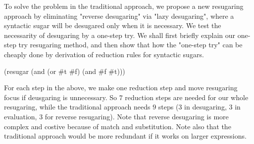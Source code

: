 To solve the problem in the traditional approach, we propose a new resugaring approach by eliminating "reverse desugaring" via "lazy desugaring", where a syntactic sugar will be desugared only when it is necessary. We test the necessarity of desugaring by a one-step try. We shall first briefly explain our one-step try resugaring method, and then show that how the "one-step try" can be cheaply done by derivation of reduction rules for syntactic sugars.

\begin{Codes}
    (resugar (and (or \#t \#f) (and \#f \#t)))
 
 
\end{Codes}

For each step in the above, we make one reduction step and move resugaring focus if deusgaring is unnecessary. So $7$ reduction steps are needed for our whole resugaring, while the traditional approach needs $9$ steps ($3$ in desugaring, $3$ in evaluation, $3$ for reverse resugaring). Note that reverse desugaring is more complex and costive because of match and substitution. Note also that the traditional approach would be more redundant if it works on larger expressions.


